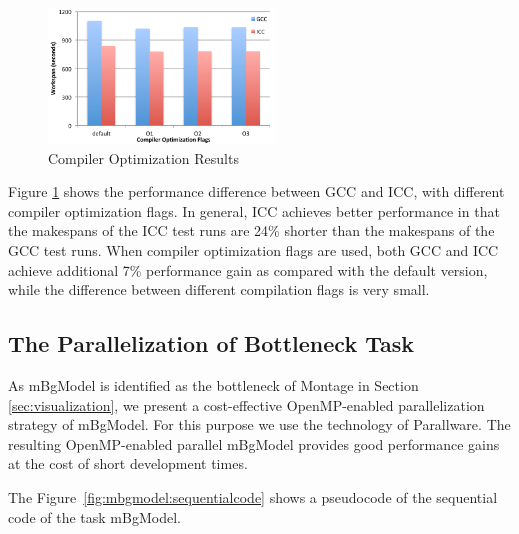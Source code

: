 \begin{figure}[t!]
\centering
\includegraphics[width=6cm]{fig01}
\vspace{-5pt}
\caption{Compiler Optimization Results}
\vspace{-10pt}
\label{fig:compiler}
\end{figure}


Figure \ref{fig:compiler} shows the performance difference between GCC and ICC, with different compiler optimization flags. In general, ICC achieves better performance in that the makespans of the ICC test runs are 24\% shorter than the makespans of the GCC test runs. When compiler optimization flags are used, both GCC and ICC achieve additional 7\% performance gain as compared with the default version, while the difference between different compilation flags is very small.

\subsection{The Parallelization of Bottleneck Task}
\label{sec:parallware}

As mBgModel is identified as the bottleneck of Montage in Section \ref{sec:visualization}, we present a cost-effective OpenMP-enabled parallelization strategy of mBgModel. For this purpose we use the technology of Parallware. The resulting OpenMP-enabled parallel mBgModel provides good performance gains at the cost of short development times. 

The Figure~\ref{fig:mbgmodel:sequentialcode} shows a pseudocode of the sequential code of the task mBgModel. 


